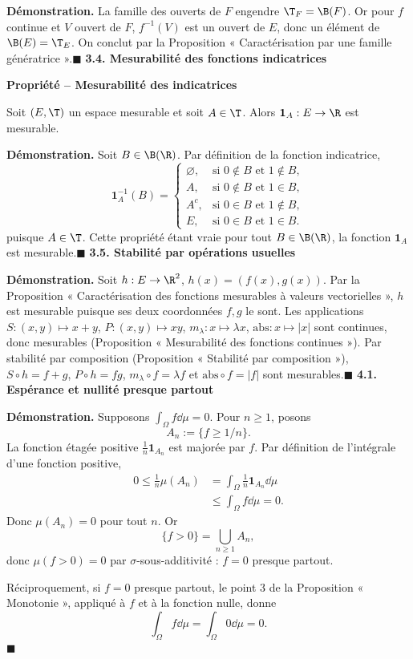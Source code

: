 
\textbf{Démonstration.} La famille des ouverts de $F$ engendre $\T_F=\B(F)$. Or pour $f$ continue et $V$ ouvert de $F$, $f^{-1}(V)$ est un ouvert de $E$, donc un élément de $\B(E)=\T_E$. On conclut par la Proposition « Caractérisation par une famille génératrice ».\hfill$\blacksquare$
\textbf{3.4. Mesurabilité des fonctions indicatrices}

\textbf{Propriété – Mesurabilité des indicatrices}

Soit $(E,\T)$ un espace mesurable et soit $A\in\T$. Alors $\mathbf1_A:E\to\R$ est mesurable.

\textbf{Démonstration.} Soit $B\in\B(\R)$. Par définition de la fonction indicatrice,
\[
\mathbf1_A^{-1}(B)=\begin{cases}
\varnothing,&\text{si }0\notin B\text{ et }1\notin B,\\
A,&\text{si }0\notin B\text{ et }1\in B,\\
A^c,&\text{si }0\in B\text{ et }1\notin B,\\
E,&\text{si }0\in B\text{ et }1\in B.
\end{cases}
\]
puisque $A\in\T$. Cette propriété étant vraie pour tout $B\in\B(\R)$, la fonction $\mathbf1_A$ est mesurable.\hfill$\blacksquare$
\textbf{3.5. Stabilité par opérations usuelles}


\textbf{Démonstration.} Soit $h:E\to\R^2$, $h(x)=(f(x),g(x))$. Par la Proposition « Caractérisation des fonctions mesurables à valeurs vectorielles », $h$ est mesurable puisque ses deux coordonnées $f,g$ le sont. Les applications $S:(x,y)\mapsto x+y$, $P:(x,y)\mapsto xy$, $m_\lambda:x\mapsto\lambda x$, $\mathrm{abs}:x\mapsto|x|$ sont continues, donc mesurables (Proposition « Mesurabilité des fonctions continues »). Par stabilité par composition (Proposition « Stabilité par composition »), $S\circ h=f+g$, $P\circ h=fg$, $m_\lambda\circ f=\lambda f$ et $\mathrm{abs}\circ f=|f|$ sont mesurables.\hfill$\blacksquare$
\textbf{4.1. Espérance et nullité presque partout}


\textbf{Démonstration.} Supposons $\int_\Omega f\dd\mu=0$. Pour $n\ge1$, posons
\[A_n:=\{f\ge1/n\}.\]
La fonction étagée positive $\frac1n\mathbf1_{A_n}$ est majorée par $f$. Par définition de l’intégrale d’une fonction positive,
\[
\begin{aligned}
0\le\frac1n\mu(A_n)&=\int_\Omega\frac1n\mathbf1_{A_n}\dd\mu\\
&\le\int_\Omega f\dd\mu=0.
\end{aligned}
\]
Donc $\mu(A_n)=0$ pour tout $n$. Or
\[\{f>0\}=\bigcup_{n\ge1}A_n,\]
donc $\mu(f>0)=0$ par $\sigma$-sous-additivité : $f=0$ presque partout.

Réciproquement, si $f=0$ presque partout, le point 3 de la Proposition « Monotonie », appliqué à $f$ et à la fonction nulle, donne
\[\int_\Omega f\dd\mu=\int_\Omega0\dd\mu=0.\]
\hfill$\blacksquare$
